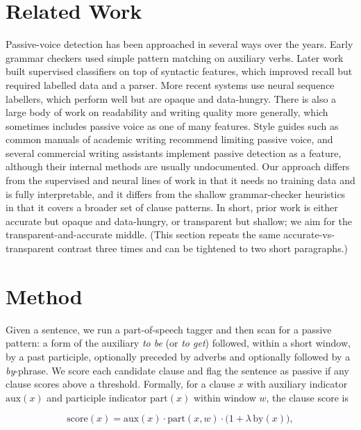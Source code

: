 \documentclass[11pt]{article}
\begin{document}
\section{Related Work}

Passive-voice detection has been approached in several ways over the years. Early
grammar checkers used simple pattern matching on auxiliary verbs. Later work
built supervised classifiers on top of syntactic features, which improved recall
but required labelled data and a parser. More recent systems use neural sequence
labellers, which perform well but are opaque and data-hungry. There is also a
large body of work on readability and writing quality more generally, which
sometimes includes passive voice as one of many features. Style guides such as
common manuals of academic writing recommend limiting passive voice, and several
commercial writing assistants implement passive detection as a feature, although
their internal methods are usually undocumented. Our approach differs from the
supervised and neural lines of work in that it needs no training data and is
fully interpretable, and it differs from the shallow grammar-checker heuristics
in that it covers a broader set of clause patterns. In short, prior work is
either accurate but opaque and data-hungry, or transparent but shallow; we aim
for the transparent-and-accurate middle. (This section repeats the
same accurate-vs-transparent contrast three times and can be tightened to two
short paragraphs.)

\section{Method}

Given a sentence, we run a part-of-speech tagger and then scan for a passive
pattern: a form of the auxiliary \emph{to be} (or \emph{to get}) followed,
within a short window, by a past participle, optionally preceded by adverbs and
optionally followed by a \emph{by}-phrase. We score each candidate clause and
flag the sentence as passive if any clause scores above a threshold. Formally,
for a clause $x$ with auxiliary indicator $\mathrm{aux}(x)$ and participle
indicator $\mathrm{part}(x)$ within window $w$, the clause score is

\begin{equation}
    \mathrm{score}(x) = \mathrm{aux}(x)\cdot \mathrm{part}(x, w)\cdot
    \big(1 + \lambda\,\mathrm{by}(x)\big),
    \label{eq:score}
\end{equation}
\end{document}
